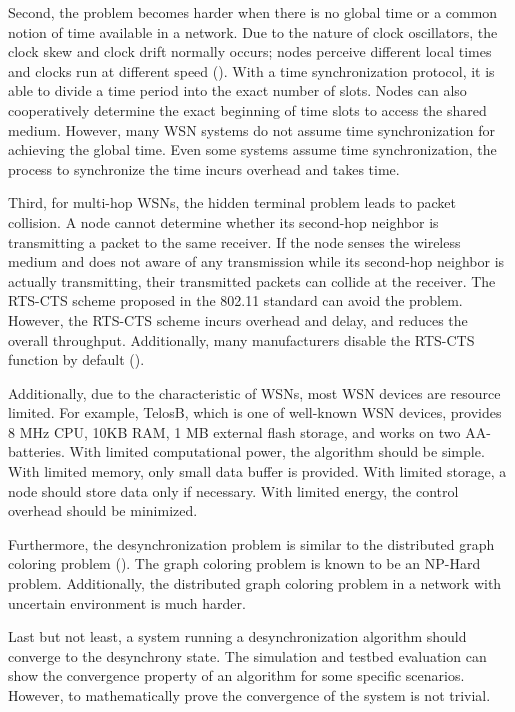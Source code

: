Second, the problem becomes harder when there is no global time or a common notion of time available in a network.
Due to the nature of clock oscillators, the clock skew and clock drift normally occurs;
nodes perceive different local times and clocks run at different speed  (\cite{5614702}).
With a time synchronization protocol, it is able to divide a time period into the exact number of slots.
Nodes can also cooperatively determine the exact beginning of time slots to access the shared medium.
However, many WSN systems do not assume time synchronization for achieving the global time.
Even some systems assume time synchronization, the process to synchronize the time incurs overhead and takes time.

Third, for multi-hop WSNs, the hidden terminal problem leads to packet collision.
A node cannot determine whether its second-hop neighbor is transmitting a packet to the same receiver.
If the node senses the wireless medium and does not aware of any transmission while its second-hop neighbor is actually transmitting, their transmitted packets can collide at the receiver.
The RTS-CTS scheme proposed in the 802.11 standard can avoid the problem. However, the RTS-CTS scheme incurs overhead and delay, and reduces the overall throughput. Additionally, many manufacturers disable the RTS-CTS function by default (\cite{zigzag}).

Additionally, due to the characteristic of WSNs, most WSN devices are resource limited. 
For example, TelosB, which is one of well-known WSN devices, provides 8 MHz CPU, 10KB RAM, 1 MB external flash storage, and works on two AA-batteries.
With limited computational power, the algorithm should be simple.
With limited memory, only small data buffer is provided.
With limited storage, a node should store data only if necessary.
With limited energy, the control overhead should be minimized.

Furthermore, the desynchronization problem is similar to the distributed graph coloring problem (\cite{5062165}).
The graph coloring problem is known to be an NP-Hard problem.
Additionally, the distributed graph coloring problem in a network with uncertain environment is much harder.

Last but not least, a system running a desynchronization algorithm should converge to the desynchrony state. The simulation and testbed evaluation can show the convergence property of an algorithm for some specific scenarios. 
However, to mathematically prove the convergence of the system is not trivial.

